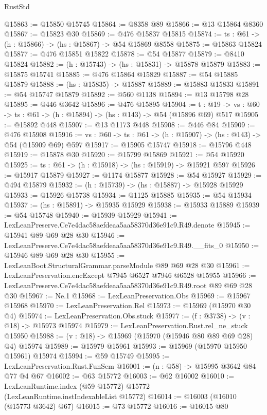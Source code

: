 \begin{lexlean}{RustStd}
\begin{coremodule}
@15863 := @15850 @15745
@15864 := @8358 @89
@15866 := @13 @15864 @8360
@15867 := @15823 @30
@15869 := @476 @15837 @15815
@15874 := {ts : @61} -> (h : @15866) -> (hs : @15867) -> @54 @15869 @8558
@15875 := @15863 @15824
@15877 := @476 @15851 @15822
@15878 := @54 @15877
@15879 := @8410 @15824
@15882 := (h : @15743) -> (hs : @15831) -> @15878 @15879
@15883 := @15875 @15741
@15885 := @476 @15864 @15829
@15887 := @54 @15885 @15879
@15888 := (hs : @15835) -> @15887
@15889 := @15883 @15833
@15891 := @54 @15747 @15879
@15892 := @560 @1138
@15894 := @13 @15798 @28
@15895 := @446 @3642
@15896 := @476 @15895
@15904 := {t : @19} ->
  {vs : @60} -> {ts : @61} -> (h : @15894) -> (hs : @143) -> @54 (@15896 @69) @517
@15905 := @15892 @448
@15907 := @13 @1173 @448
@15908 := @446 @84
@15909 := @476 @15908
@15916 := {vs : @60} -> {ts : @61} -> (h : @15907) -> (hs : @143) -> @54 (@15909 @69) @597
@15917 := @15905 @15747
@15918 := @15796 @448
@15919 := @15878 @30
@15920 := @15799 @15869
@15921 := @54 @15920
@15925 := {ts : @61} -> (h : @15918) -> (hs : @15919) -> @15921 @597
@15926 := @15917 @15879
@15927 := @1174 @15877
@15928 := @54 @15927
@15929 := @494 @15879
@15932 := (h : @15739) -> (hs : @15887) -> @15928 @15929
@15933 := @15926 @15738
@15934 := @1125 @15885
@15935 := @54 @15934
@15937 := (hs : @15891) -> @15935 @15929
@15938 := @15933 @15889
@15939 := @54 @15748
@15940 := @15939 @15929
@15941 := LexLeanPreserve.Ce7e4dac58aefdeaa5aa58370d36e91c9.R49.denote
@15945 := @15941 @89 @69 @28 @30
@15946 := LexLeanPreserve.Ce7e4dac58aefdeaa5aa58370d36e91c9.R49.__fits_0
@15950 := @15946 @89 @69 @28 @30
@15955 := LexLeanBoot.StructuralGrammar.parseModule @89 @69 @28 @30
@15961 := LexLeanPreservation.encExcept @7945 @6527 @7946 @6528 @15955
@15966 := LexLeanPreserve.Ce7e4dac58aefdeaa5aa58370d36e91c9.R49.root @89 @69 @28 @30
@15967 := Ne.{1}
@15968 := LexLeanPreservation.Obs
@15969 := @15967 @15968
@15970 := LexLeanPreservation.Rel
@15973 := @15969 (@15970 @30 @4)
@15974 := LexLeanPreservation.Obs.stuck
@15977 := (f : @3738) -> (v : @18) -> @15973 @15974
@15979 := LexLeanPreservation.Rust.rel_ne_stuck @15950
@15988 := (v : @18) -> @15969 (@15970 (@15946 @80 @89 @69 @28) @4) @15974
@15989 := @15979 @15961
@15993 := @15969 (@15970 @15950 @15961) @15974
@15994 := @59 @15749
@15995 := LexLeanPreservation.Rust.FunSem
@16001 := (n : @58) -> @15995 @3642 @84 @77 @4 @67
@16002 := @63 @15772
@16003 := @62 @16002
@16010 := LexLeanRuntime.index (@59 @15772) @15772 (LexLeanRuntime.instIndexableList @15772)
@16014 := @16003 (@16010 (@15773 @3642) @67)
@16015 := @73 @15772
@16016 := @16015 @80

\end{coremodule}
\end{lexlean}
